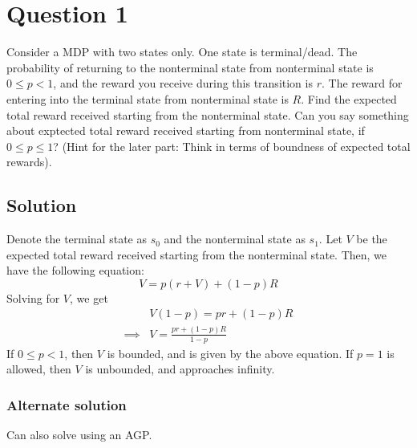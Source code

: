 \section*{Question 1}

Consider a MDP with two states only.
One state is terminal/dead.
The probability of returning to the nonterminal state from nonterminal state is \( 0 \leq p<1 \), and the reward you receive during this transition is \( r \).
The reward for entering into the terminal state from nonterminal state is \( R \).
Find the expected total reward received starting from the nonterminal state.
Can you say something about exptected total reward received starting from nonterminal state, if \( 0 \leq p \leq 1 \)?
(Hint for the later part: Think in terms of boundness of expected total rewards).

\subsection*{Solution}

Denote the terminal state as \( s_0 \) and the nonterminal state as \( s_1 \).
Let \( V \) be the expected total reward received starting from the nonterminal state.
Then, we have the following equation:
\[
    V = p(r + V) + (1-p)R
\]
Solving for \( V \), we get
\begin{align*}
     &
    V(1 - p) = pr + (1-p)R
    \\
    \implies
     &
    \boxed{ V = \frac{pr + (1-p)R}{1-p} }
\end{align*}
If \( 0 \leq p < 1 \), then \( V \) is bounded, and is given by the above equation.
If \( p = 1 \) is allowed, then \( V \) is unbounded, and approaches infinity.

\subsubsection*{Alternate solution}

Can also solve using an AGP.\@
